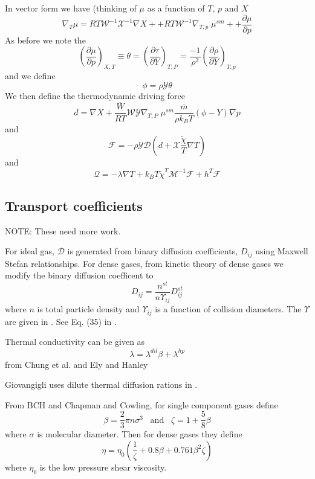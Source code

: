 \documentclass[11pt]{article}
\newcommand{\HeatFlux}{\boldsymbol{\mathcal{Q}}}
\newcommand{\SpeciesFlux}{\boldsymbol{\mathcal{F}}}
\newcommand{\mbar}{\overline{m}}
\begin{document}
In vector form we have (thinking of $\mu$ as a function of $T$, $p$ and $X$
\begin{equation}
\nabla_T \mu
= R T \mathcal{W}^{-1} \mathcal{X}^{-1} \nabla X +
+ R T \mathcal{W}^{-1} \nabla_{T,p} \; \mu^{sm} +
+ \frac{\partial \mu}{\partial p}
\end{equation}
As before we note the
\[
\left(\frac{\partial \mu}{\partial p}\right)_{X,T} \equiv \theta = \left(\frac{ \partial \tau}{\partial Y}\right)_{T,P}
 =
\frac{-1}{\rho^2}\left (\frac{\partial \rho}{\partial Y} \right)_{T,p}
\]
and we define
\[
\phi = \rho \mathcal{Y} \theta
\]
We then define the thermodynamic driving force
\[
d = \nabla X  + \frac{\overline{W}}{R T} \mathcal{W} \mathcal{Y} \nabla_{T,P} \; \mu^{sm}  \frac{\mbar}{\rho k_B T} (\phi - Y) \nabla p
\]
and
\[
\mathcal{F} = - \rho \mathcal{Y} \mathcal{D} ( d + \mathcal{X} \frac{ \tilde{\chi}}{T} \nabla T)
\]
and
\[
\HeatFlux = - \lambda \nabla T + k_B T {\tilde{\chi}}^T \mathcal{M}^{-1} \SpeciesFlux + h^T \SpeciesFlux
\]

\subsection{Transport coefficients}

NOTE:  These need more work.

For ideal gas, $\mathcal{D}$ is generated from binary diffusion coefficients, $D_{ij}$ using
Maxwell Stefan relationships.
For dense gases, from kinetic theory of dense gases we modify the binary diffusion coefficent to
\[
D_{ij} = \frac{n^{st}}{n \Upsilon_{ij}} D_{ij}^{st}
\]
where $n$ is total particle density and $\Upsilon_{ij}$ is a function of collision diameters.
The $\Upsilon$ are given in \cite{KurochkinETAL:1984}.
See Eq. (35) in \cite{giovangigli_CTM:2011}.

Thermal conductivity can be given as
\[
\lambda = \lambda^{dil} \beta + \lambda^{hp}
\]
from Chung et al. \cite{chung:1988} and Ely and Hanley \cite{ElyHanley:1983}

Giovangigli uses dilute thermal diffusion rations in 
\cite{giovangigli_CTM:2011}.

From BCH and Chapman and Cowling,
for single component gases define
\[
\beta = \frac {2}{3} \pi n \sigma^3 \;\;\; \mathrm{and} \;\;\; \zeta = 1+\frac{5}{8} \beta
\]
where $\sigma$ is molecular diameter.
Then for dense gases they define
\[
\eta = \eta_0 (\frac{1}{\zeta} + 0.8 \beta + 0.761 \beta^2 \zeta)
\]
where $\eta_0$ is the low pressure shear viscosity.
\end{document}
